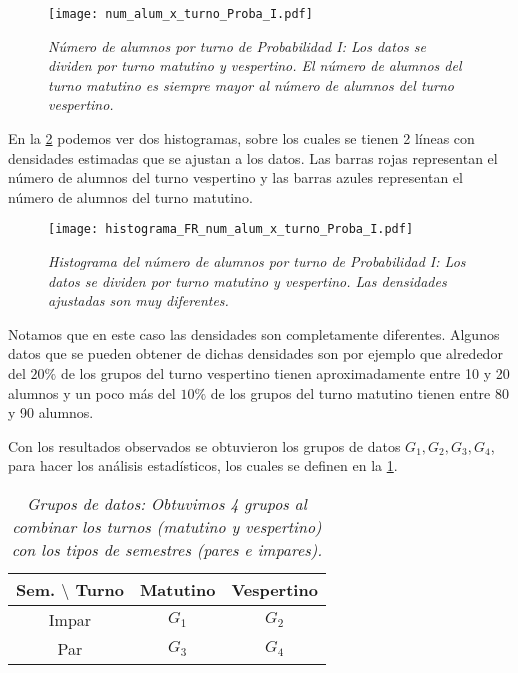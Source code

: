 \begin{figure}[H]
\centering
\texttt{[image: num\_alum\_x\_turno\_Proba\_I.pdf]} %
\caption[\textit{Número de alumnos por turno: Probabilidad I}]{\textit{Número de alumnos por turno de Probabilidad I: Los datos se dividen por turno matutino y vespertino. El número de alumnos del turno matutino es siempre mayor al número de alumnos del turno vespertino.}}\label{num_alum_x_turno_Proba_I}
\end{figure}

En la \figurename{\ref{HistAlumTurnoProbaI}} podemos ver dos histogramas, sobre los cuales se tienen 2 líneas con  densidades estimadas que se ajustan a los datos. Las barras rojas representan el número de alumnos del turno vespertino y las barras azules representan el número de alumnos del turno matutino.


\begin{figure}[H]
\centering
\texttt{[image: histograma\_FR\_num\_alum\_x\_turno\_Proba\_I.pdf]} %
\caption[\textit{Histograma del número de alumnos por turno: Probabilidad I}]{\textit{Histograma del número de alumnos por turno de Probabilidad I: Los datos se dividen por turno matutino y vespertino. Las densidades ajustadas son muy diferentes.}}\label{HistAlumTurnoProbaI}
\end{figure}

Notamos que en este caso las densidades son completamente diferentes. Algunos datos que se pueden obtener de dichas densidades son por ejemplo que alrededor del $20\%$ de los grupos del turno vespertino tienen aproximadamente entre 10 y 20 alumnos y un poco más del $10\%$ de los grupos del turno matutino tienen entre 80 y 90 alumnos.

Con los resultados observados se obtuvieron los grupos de datos $G_{1}, G_{2}, G_{3}, G_{4}$, para hacer los análisis estadísticos, los cuales se definen en la \tablename{\ref{GposDatos}}.

\begin{table}[H]
\centering
\begin{tabular}{|c|c|c|}
\hline 
\textbf{Sem.} $\setminus$ \textbf{Turno} & \textbf{Matutino} & \textbf{Vespertino} \\ 
\hline 
Impar & $G_{1}$ & $G_{2}$ \\ 
\hline 
Par & $G_{3}$ & $G_{4}$ \\ 
\hline 
\end{tabular}
\caption[\textit{Grupos de datos}]{\textit{Grupos de datos: Obtuvimos 4 grupos al combinar los turnos (matutino y vespertino) con los tipos de semestres (pares e impares).}}\label{GposDatos}
\end{table}
